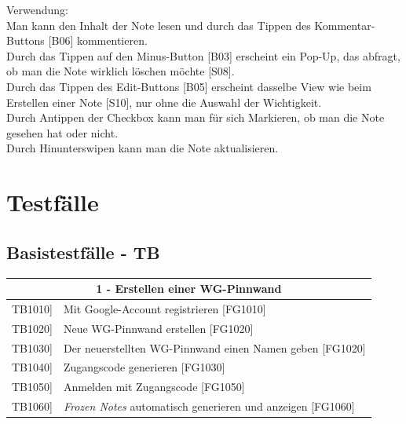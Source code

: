 \documentclass[a4paper]{scrreprt}
\begin{document}
    	\hfill
    	
    	Verwendung:\\
    	Man kann den Inhalt der Note lesen und durch
    	das Tippen des Kommentar-Buttons {[}B06{]}
    	kommentieren. \\
    	Durch das Tippen auf den 
    	Minus-Button {[}B03{]} erscheint ein Pop-Up, das abfragt, ob man die Note wirklich löschen möchte {[}S08{]}.\\
    	Durch das Tippen des Edit-Buttons {[}B05{]} erscheint
    	dasselbe View wie beim Erstellen einer Note {[}S10{]}, nur ohne die Auswahl der Wichtigkeit.\\ Durch Antippen der Checkbox kann man für sich Markieren, ob man die Note gesehen hat oder nicht.\\
    	 Durch Hinunterswipen kann man die Note aktualisieren.
    	
    	\clearpage
    	
    	

    \chapter{Testfälle}
    
    	\section{Basistestfälle - TB}    
    	
	    \begin{table}[h!]
	    	\centering
	    	\label{my-label}
	    	\begin{tabular}{p{2cm}p{12cm}}
	    		
	    		\multicolumn{2}{c}{\textbf{1 - Erstellen einer WG-Pinnwand}} \\ \hline
	    		\centering{[}TB1010{]} & Mit Google-Account registrieren {[}FG1010{]}\\
	    		\centering{[}TB1020{]}& Neue WG-Pinnwand erstellen {[}FG1020{]}                                \\
	    		\centering{[}TB1030{]} & Der neuerstellten WG-Pinnwand einen Namen geben {[}FG1020{]} \\ 
	    		\centering{[}TB1040{]}& Zugangscode generieren {[}FG1030{]}\\ 
	    		\centering{[}TB1050{]}& Anmelden mit Zugangscode {[}FG1050{]}\\ 
	    		\centering{[}TB1060{]}& \textit{Frozen Notes} automatisch generieren und anzeigen {[}FG1060{]}\\ 
	    		\hline
	    	\end{tabular}
	    \end{table}
	    
\end{document}
